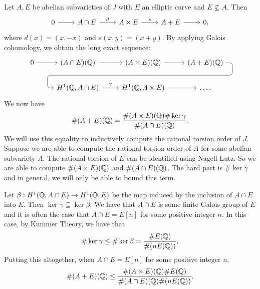 Let $A, E$ be abelian subvarieties of $J$ with $E$ an elliptic curve and
$E\not\subseteq A$. Then
\begin{equation}%
    \label{eq:ses_ab}
    \begin{tikzcd}
        0 \arrow[r] &
        A\cap E \arrow[r,"d"] &
        A\times E \arrow[r,"s"] &
        A+E \arrow[r] &
        0,
    \end{tikzcd}
\end{equation}
where $d(x)=(x,-x)$ and $s(x,y)=(x+y)$. By applying Galois cohomology, we
obtain the long exact sequence:
\begin{equation}%
    \label{eq:les_ab}
    \begin{tikzcd}
        0 \rar 
        &
        (A\cap E)(\QQ) \rar 
        &
        (A\times E)(\QQ) \rar
        \arrow[phantom, ""{coordinate, name=W}]{d}
        &
        (A+E)(\QQ)
        \arrow[
        rounded corners,
        to path={%
            -- ([xshift=2ex]\tikztostart.east)
            |- (W) [near end]\tikztonodes
            -| ([xshift=-2ex]\tikztotarget.west)
            -- (\tikztotarget)
        }
        ]{dll} \\
        &
        H^1(\QQ,A\cap E) \rar["\gamma"] 
        &
        H^1(\QQ,A\times E) \rar 
        & \ldots.
    \end{tikzcd}
\end{equation}
We now have
\begin{equation*}%
    \label{eq:galois_cohomology_order}
    \# (A+E)(\QQ) =
    \frac{\# (A\times E)(\QQ) \# \ker\gamma}{\# (A\cap E)(\QQ)}.
\end{equation*}
We will use this equality to inductively compute the rational torsion order of
$J$. Suppose we are able to compute the rational torsion order of $A$ for some
abelian subvariety $A$. The rational torsion of $E$ can be identified using
Nagell-Lutz. So we are able to compute $\#(A\times E)(\mathbb{Q})$ and $\#(A\cap
E)(\mathbb{Q})$. The hard part is $\#\ker\gamma$ and in general, we will only be able
to bound this term.

Let $\beta:H^1(\mathbb{Q}, A\cap E)\to H^1(\mathbb{Q}, E)$ be the map induced by the
inclusion of $A\cap E$ into $E$. Then $\ker\gamma\subseteq \ker\beta$. We have
that $A\cap E$ is some finite Galois group of $E$ and it is often the case that
$A\cap E=E[n]$ for some positive integer $n$. In this case, by Kummer Theory,
we have that
\[
    \#\ker\gamma\leq \#\ker\beta = \frac{\# E(\mathbb{Q})}{\# (nE(\mathbb{Q}))}.
\]
Putting this altogether, when $A\cap E=E[n]$ for some positive integer $n$,
\begin{equation}
    \label{eq:galois_cohomology_bound}
    \# (A+E)(\mathbb{Q}) \leq
    \frac{\# (A\times E)(\mathbb{Q})\#E(\mathbb{Q})}{\# (A\cap E)(\mathbb{Q})\#(nE(\mathbb{Q}))}. 
\end{equation}

